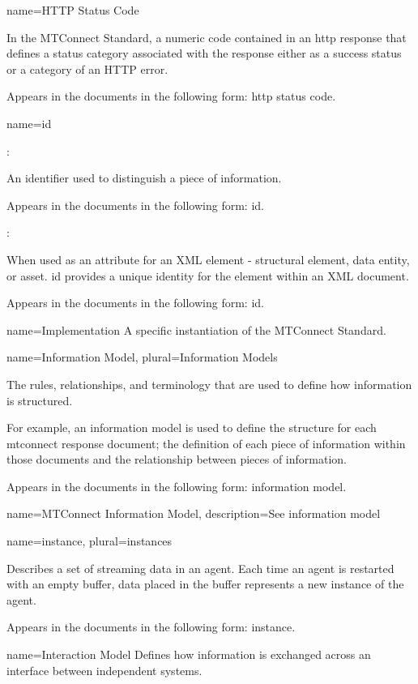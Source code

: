 {
  name={HTTP Status Code}
}
{
	In the MTConnect Standard, a numeric code contained in an \gls{http response} that defines a status category associated with the \gls{response} either as a success status or a category of an HTTP error.  

	Appears in the documents in the following form: \gls{http status code}.
}


{
  name={id}
}
{
	:

	An identifier used to distinguish a piece of information.

	Appears in the documents in the following form: id.

	:

	When used as an attribute for an XML element - \gls{structural element}, \gls{data entity}, or \gls{asset}.  \gls{id} provides a unique identity for the element within an XML document.

	Appears in the documents in the following form: \gls{id}.
}


{
  name={Implementation}
}
{
	A specific instantiation of the MTConnect Standard.
}


{
  name={Information Model},
  plural={Information Models}
}
{
	The rules, relationships, and terminology that are used to define how information is structured.

	For example, an information model is used to define the structure for each \gls{mtconnect response document}; the definition of each piece of information within those documents and the relationship between pieces of information.

	Appears in the documents in the following form: \gls{information model}.
}

{
  name={MTConnect Information Model},
  description={See \gls{information model}}
}

{
  name={instance},
  plural={instances}
}
{
	Describes a set of \gls{streaming data} in an \gls{agent}.  Each time an \gls{agent} is restarted with an empty \gls{buffer}, data placed in the \gls{buffer} represents a new \gls{instance} of the \gls{agent}.

	Appears in the documents in the following form: \gls{instance}.
}


{
  name={Interaction Model}
}
{
	Defines how information is exchanged across an \gls{interface} between independent systems.
}


